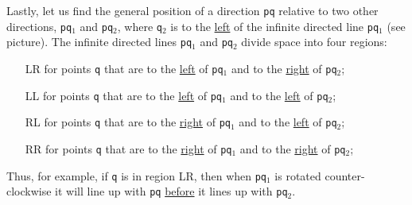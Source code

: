 \documentclass[12pt]{article}
\begin{document}
\medskip

\begin{minipage}{\textwidth}\raggedright
\begin{wrapfigure}{r}{0.48\textwidth}
\end{wrapfigure}
Lastly, let us find the general position of a direction {\tt pq} relative
to two other directions, {\tt pq$_1$}  and {\tt pq$_2$}, where
{\tt q$_2$} is to the \underline{left} of the infinite directed line
{\tt pq$_1$} (see picture).
The infinite directed lines {\tt pq$_1$}  and {\tt pq$_2$} divide space into
four regions:
\begin{itemize}
\item[LR]
for points {\tt q} that are to the \underline{left} of {\tt pq$_1$}
and to the \underline{right} of {\tt pq$_2$};
\item[LL] for points {\tt q} that are to the \underline{left} of {\tt pq$_1$}
and to the \underline{left} of {\tt pq$_2$};
\item[RL] for points {\tt q} that are to the \underline{right} of {\tt pq$_1$}
and to the \underline{left} of {\tt pq$_2$};
\item[RR] for points {\tt q} that are to the \underline{right} of {\tt pq$_1$}
and to the \underline{right} of {\tt pq$_2$};
\end{itemize}
\end{minipage}

\medskip

Thus, for example,
if {\tt q} is in region LR, then when {\tt pq$_1$} is rotated
counter-clock\-wise
it will line up with {\tt pq} \underline{before} it lines up with
{\tt pq$_2$}.
\end{document}
